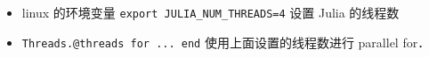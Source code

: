 
\begin{issues}
\issueDraft
\end{issues}

\begin{itemize}
\item linux 的环境变量 \verb|export JULIA_NUM_THREADS=4| 设置 Julia 的线程数
\item \verb|Threads.@threads for ... end| 使用上面设置的线程数进行 parallel for．
\end{itemize}
